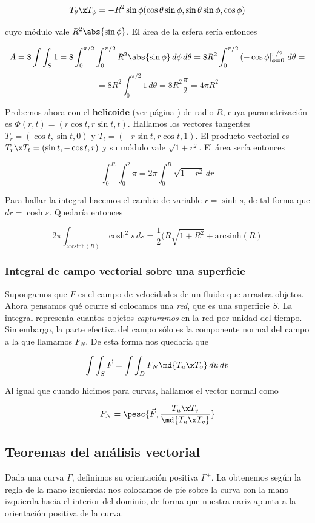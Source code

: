 \documentclass[nochap]{apuntes}
\begin{document}
\[ T_\theta\x T_\phi = -R^2\sin\phi(\cos\theta\sin\phi, \sin\theta\sin\phi,\cos\phi) \]

cuyo módulo vale $R^2\abs{\sin\phi}$. El área de la esfera sería entonces

\[ A = 8\int\int_S 1 = 8\int_0^{\pi /2}\int_0^{\pi /2} R^2\abs{\sin\phi}\,d\phi\,d\theta = 8R^2\int_0^{\pi/2}\left(-\cos\phi\right|_{\phi = 0}^{\pi /2} \,d\theta = \]
\[ = 8R^2\int_0^{\pi /2} 1\,d\theta = 8 R^2\frac{\pi}{2	} = 4\pi R^2\]

Probemos ahora con el \textbf{helicoide} (ver página \pageref{Helicoide}) de radio $R$, cuya parametrización es $\Phi(r,t) = (r\cos t, r\sin t, t)$. Hallamos los vectores tangentes $T_r = (\cos t, \sin t, 0)$ y $T_t=(-r\sin t, r\cos t, 1)$. El producto vectorial es $T_r\x T_t = (\sin t, -\cos t, r)$ y su módulo vale $\sqrt{1+r^2}$. El área sería entonces

\[ \int_0^R\int_0^2\pi = 2\pi\int_0^R\sqrt{1+r^2}\,dr \]

Para hallar la integral hacemos el cambio de variable $r = \sinh s$, de tal forma que $dr = \cosh s$. Quedaría entonces

\[ 2\pi \int_{\mathrm{arcsinh}(R)} \cosh^2 s \,ds  =  \frac{1}{2} (R \sqrt{1 + R^2}+ \textrm{arcsinh} (R)\]

\subsubsection{Integral de campo vectorial sobre una superficie}

Supongamos que $F$ es el campo de velocidades de un fluido que arrastra objetos. Ahora pensamos qué ocurre si colocamos una \textit{red}, que es una superficie $S$. La integral representa cuantos objetos \textit{capturamos} en la red por unidad del tiempo. Sin embargo, la parte efectiva del campo sólo es la componente normal del campo a la que llamamos $F_N$. De esta forma nos quedaría que

\[ \int\int_S\vec{F} = \int\int_D F_N \md{T_u\x T_v}\,du\,dv \]

Al igual que cuando hicimos para curvas, hallamos el vector normal como 

\[ F_N = \pesc{\vec{F}, \frac{T_u\x T_v}{\md{T_u\x T_v}} }\]

\subsection{Teoremas del análisis vectorial}

\begin{defn}
Dada una curva $\Gamma$, definimos su orientación positiva $\Gamma^+$. La obtenemos según la regla de la mano izquierda: nos colocamos de pie sobre la curva con la mano izquierda hacia el interior del dominio, de forma que nuestra nariz apunta a la orientación positiva de la curva.
\end{defn}
\end{document}
